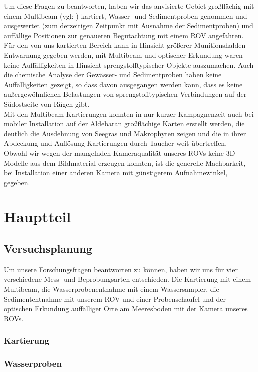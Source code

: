 \documentclass[12pt,titlepage]{scrreprt}
\begin{document}
Um diese Fragen zu beantworten, haben wir das anvisierte Gebiet großflächig mit einem Multibeam (vgl: \cite{multib}) kartiert, Wasser- und Sedimentproben genommen und ausgewertet (zum derzeitigen Zeitpunkt mit Ausnahme der Sedimentproben) und auffällige Positionen zur genaueren Begutachtung mit einem ROV angefahren.\\
Für den von uns kartierten Bereich kann in Hinsicht größerer Munitionshalden Entwarnung gegeben werden, mit Multibeam und optischer Erkundung waren keine Auffälligkeiten in Hinsicht sprengstofftypischer Objekte auszumachen. Auch die chemische Analyse der Gewässer- und Sedimentproben haben keine Auffälligkeiten gezeigt, so dass davon ausgegangen werden kann, dass es keine außergewöhnlichen Belastungen von sprengstofftypischen Verbindungen auf der Südostseite von Rügen gibt.\\
Mit den Multibeam-Kartierungen konnten in nur kurzer Kampagnenzeit auch bei mobiler Installation auf der Aldebaran großflächige Karten erstellt werden, die deutlich die Ausdehnung von Seegras und Makrophyten zeigen und die in ihrer Abdeckung und Auflösung Kartierungen durch Taucher weit übertreffen. \\
Obwohl wir wegen der mangelnden Kameraqualität unseres ROVs keine 3D-Modelle aus dem Bildmaterial erzeugen konnten, ist die generelle Machbarkeit, bei Installation einer anderen Kamera mit günstigerem Aufnahmewinkel, gegeben.

\tableofcontents

\chapter{Hauptteil}
\section{Versuchsplanung}
Um unsere Forschungsfragen beantworten zu können, haben wir uns für vier verschiedene Mess- und Beprobungsarten entschieden. Die Kartierung mit einem Multibeam, die Wasserprobenentnahme mit einem Wassersampler, die Sedimententnahme mit unserem ROV und einer Probenschaufel und der optischen Erkundung auffälliger Orte am Meeresboden mit der Kamera unseres ROVs.
\subsection{Kartierung}

\subsection{Wasserproben}

\end{document}
